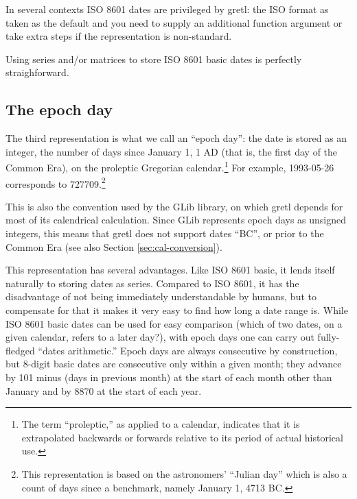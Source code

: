 In several contexts ISO 8601 dates are privileged by gretl: the ISO
format as taken as the default and you need to supply an additional
function argument or take extra steps if the representation is
non-standard.

Using series and/or matrices to store ISO 8601 basic dates is
perfectly straighforward.

\subsection{The epoch day}
\label{sec:cal-epochday}

The third representation is what we call an ``epoch day'': the date is
stored as an integer, the number of days since January 1, 1 AD
(that is, the first day of the Common Era), on the proleptic Gregorian
calendar.\footnote{The term ``proleptic,'' as applied to a calendar,
  indicates that it is extrapolated backwards or forwards relative to
  its period of actual historical use.} For example, 1993-05-26
corresponds to 727709.\footnote{This representation is based on the
astronomers' ``Julian day'' which is also a count of days since a
benchmark, namely January 1, 4713 BC.}

This is also the convention used by the \textsf{GLib} library, on
which gretl depends for most of its calendrical calculation. Since
\textsf{GLib} represents epoch days as unsigned integers, this means
that gretl does not support dates ``BC'', or prior to the Common Era
(see also Section \ref{sec:cal-conversion}).

This representation has several advantages. Like ISO 8601 basic, it
lends itself naturally to storing dates as series. Compared to ISO
8601, it has the disadvantage of not being immediately understandable
by humans, but to compensate for that it makes it very easy to find
how long a date range is. While ISO 8601 basic dates can be used for
easy comparison (which of two dates, on a given calendar, refers to a
later day?), with epoch days one can carry out fully-fledged ``dates
arithmetic.''  Epoch days are always consecutive by construction, but
8-digit basic dates are consecutive only within a given month; they
advance by 101 minus (days in previous month) at the start of each
month other than January and by 8870 at the start of each year.


